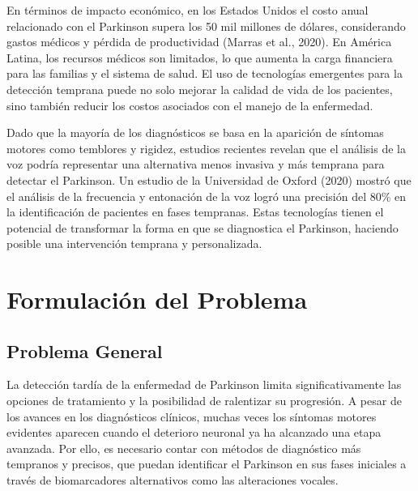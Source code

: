 \documentclass[a4paper,12pt]{article}
\begin{document}
En términos de impacto económico, en los Estados Unidos el costo anual relacionado con el Parkinson supera los 50 mil millones de dólares, considerando gastos médicos y pérdida de productividad (Marras et al., 2020). En América Latina, los recursos médicos son limitados, lo que aumenta la carga financiera para las familias y el sistema de salud. El uso de tecnologías emergentes para la detección temprana puede no solo mejorar la calidad de vida de los pacientes, sino también reducir los costos asociados con el manejo de la enfermedad.

Dado que la mayoría de los diagnósticos se basa en la aparición de síntomas motores como temblores y rigidez, estudios recientes revelan que el análisis de la voz podría representar una alternativa menos invasiva y más temprana para detectar el Parkinson. Un estudio de la Universidad de Oxford (2020) mostró que el análisis de la frecuencia y entonación de la voz logró una precisión del 80\% en la identificación de pacientes en fases tempranas. Estas tecnologías tienen el potencial de transformar la forma en que se diagnostica el Parkinson, haciendo posible una intervención temprana y personalizada.



\section{Formulación del Problema}

\subsection{Problema General}
La detección tardía de la enfermedad de Parkinson limita significativamente las opciones de tratamiento y la posibilidad de ralentizar su progresión. A pesar de los avances en los diagnósticos clínicos, muchas veces los síntomas motores evidentes aparecen cuando el deterioro neuronal ya ha alcanzado una etapa avanzada. Por ello, es necesario contar con métodos de diagnóstico más tempranos y precisos, que puedan identificar el Parkinson en sus fases iniciales a través de biomarcadores alternativos como las alteraciones vocales.
\end{document}
